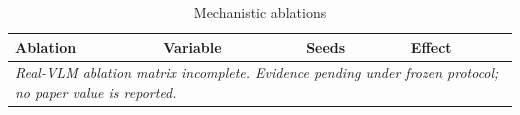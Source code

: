 \begin{table}[t]
\centering
\caption{Mechanistic ablations}
\begin{tabular}{llll}
\toprule
Ablation & Variable & Seeds & Effect \\
\midrule
\multicolumn{4}{l}{\textit{Real-VLM ablation matrix incomplete. Evidence pending under frozen protocol; no paper value is reported.}} \\
\bottomrule
\end{tabular}
\end{table}
